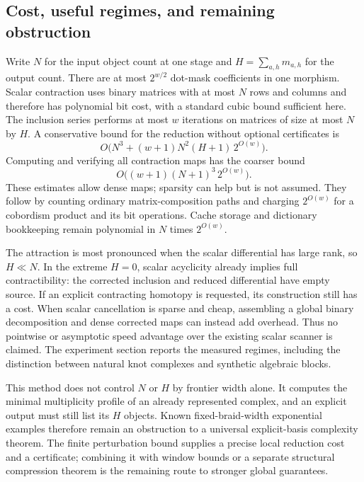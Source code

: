 \subsection{Cost, useful regimes, and remaining obstruction}

Write $N$ for the input object count at one stage and $H=\sum_{a,h}m_{a,h}$
for the output count.  There are at most $2^{w/2}$ dot-mask coefficients in
one morphism.  Scalar contraction uses binary matrices with at most $N$
rows and columns and therefore has polynomial bit cost, with a standard
cubic bound sufficient here.  The inclusion series performs at most $w$
iterations on matrices of size at most $N$ by $H$.  A conservative bound
for the reduction without optional certificates is
\begin{equation}
 O\bigl(N^3+(w+1)N^2(H+1)\,2^{O(w)}\bigr).
 \label{eq:hpl-cost}
\end{equation}
Computing and verifying all contraction maps has the coarser bound
\[
 O\bigl((w+1)(N+1)^3\,2^{O(w)}\bigr).
\]
These estimates allow dense maps; sparsity can help but is not assumed.
They follow by counting ordinary matrix-composition paths and charging
$2^{O(w)}$ for a cobordism product and its bit operations.  Cache storage
and dictionary bookkeeping remain polynomial in $N$ times $2^{O(w)}$.

The attraction is most pronounced when the scalar differential has large
rank, so $H\ll N$.  In the extreme $H=0$, scalar acyclicity already implies
full contractibility: the corrected inclusion and reduced differential
have empty source.  If an explicit contracting homotopy is requested, its
construction still has a cost.  When scalar cancellation is sparse and
cheap, assembling a global binary decomposition and dense corrected maps
can instead add overhead.  Thus no pointwise or asymptotic speed advantage
over the existing scalar scanner is claimed.  The experiment section
reports the measured regimes, including the distinction between natural
knot complexes and synthetic algebraic blocks.

This method does not control $N$ or $H$ by frontier width alone.  It
computes the minimal multiplicity profile of an already represented
complex, and an explicit output must still list its $H$ objects.  Known
fixed-braid-width exponential examples therefore remain an obstruction to
a universal explicit-basis complexity theorem.  The finite perturbation
bound supplies a precise local reduction cost and a certificate; combining
it with window bounds or a separate structural compression theorem is the
remaining route to stronger global guarantees.
